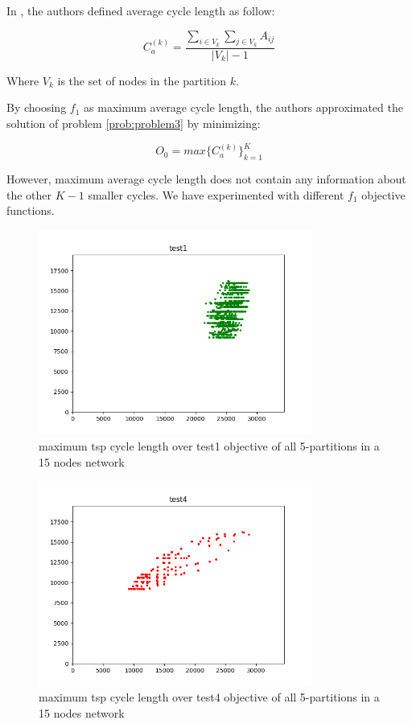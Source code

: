 In \cite{vandermeulen2019balanced}, the authors defined average cycle length as follow:

\begin{definition}
\[
C_a^{(k)} = \frac{\sum_{i \in V_k} \sum_{j \in V_k} A_{ij}}{|V_k| - 1}
\]
\end{definition}

Where $V_k$ is the set of nodes in the partition $k$.

By choosing $f_1$ as maximum average cycle length, the authors approximated the solution of problem \ref{prob:problem3} by minimizing:

\[
O_0 = max\{C_a^{(k)}\}_{k=1}^{K}
\]

However, maximum average cycle length does not contain any information about the other $K-1$ smaller cycles. We have experimented with different $f_1$ objective functions.


\begin{figure}[h!]
\centering
\includegraphics[width=0.8\textwidth]{assets/test1max.png}
\caption{maximum tsp cycle length over test1 objective of all 5-partitions in a 15 nodes network}
\label{fig:test1max}
\end{figure}

\begin{figure}[h!]
\centering
\includegraphics[width=0.8\textwidth]{assets/test4max.png}
\caption{maximum tsp cycle length over test4 objective of all 5-partitions in a 15 nodes network}
\label{fig:test4max}
\end{figure}


